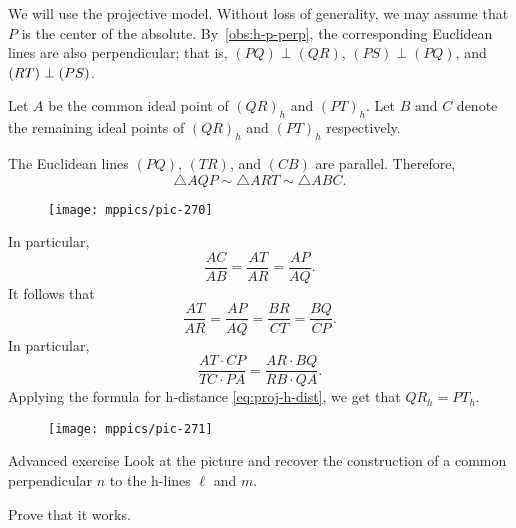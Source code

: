 We will use the projective model.
Without loss of generality, we may assume that $P$ is the center of the absolute.
By~\ref{obs:h-p-perp},
the corresponding Euclidean lines are also perpendicular;
that is, $(PQ)\perp (QR)$, $(PS)\perp(PQ)$, and $(RT)\perp (PS)$.

Let $A$ be the common ideal point of $(QR)_h$ and $(PT)_h$.
Let $B$ and $C$ denote the remaining ideal points of $(QR)_h$ and $(PT)_h$ respectively.

The Euclidean lines $(PQ)$, $(TR)$, and $(CB)$ are parallel.
Therefore,  
\[\triangle AQP\sim \triangle ART \sim\triangle ABC.\]

\begin{wrapfigure}{o}{55mm}
\vskip-0mm
\centering
\texttt{[image: mppics/pic-270]}
\vskip2mm
\end{wrapfigure}

In particular,
\[\frac{AC}{AB}=\frac{AT}{AR}=\frac{AP}{AQ}.\]
It follows that
\[\frac{AT}{AR}=\frac{AP}{AQ}=\frac{BR}{CT}=\frac{BQ}{CP}.\]
In particular, 
\[\frac{AT\cdot CP}{TC\cdot PA}=\frac{AR\cdot BQ}{RB\cdot QA}.\]
Applying the formula for h-distance \ref{eq:proj-h-dist}, we get that $QR_h=PT_h$.
\qeds

\begin{wrapfigure}{r}{35mm}
\vskip-6mm
\centering
\texttt{[image: mppics/pic-271]}
\vskip2mm
\end{wrapfigure}

\begin{thm}{Advanced exercise}\label{ex:common-perp}
Look at the picture and recover the construction of a common perpendicular $n$ to the h-lines $\ell$ and $m$.

Prove that it works.
\end{thm}
